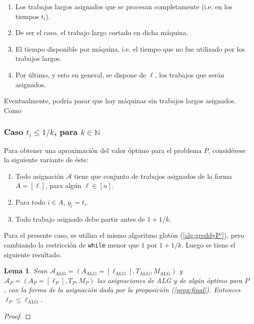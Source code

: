 \documentclass[10pt]{article}
\newcommand{\N}{\mathbb N}
\theoremstyle{plain}
\newtheorem{lem}{Lema}
\theoremstyle{definition}
\begin{document}
\begin{enumerate}
\item Los trabajos largos asignados que se procesan completamente (i.e. en los tiempos $t_i$).
\item De ser el caso, el trabajo largo cortado en dicha máquina.
\item El tiempo disponible por máquina, i.e. el tiempo que no fue utilizado por los trabajos largos.
\item Por último, y esto en general, se dispone de $\ell$, los trabajos que serán asignados. 
\end{enumerate} 

Eventualmente, podría pasar que hay máquinas sin trabajos largos asignados. Como  
\newpage
\subsubsection*{Caso $t_i \leq 1/k$, para $k \in \N$}

Para obtener una aproximación del valor óptimo para el problema $P$, considérese la siguiente variante de éste: 
\begin{enumerate}
\item Todo asignación $\mathcal{A}$ tiene que conjunto de trabajos asignados de la forma $A=[\ell]$, para algún $\ell \in [n]$. 
\item Para todo $i \in A$, $y_i = t_i$.
\item Todo trabajo asignado debe partir antes de $1+1/k$. 
\end{enumerate}

Para el presente caso, se utiliza el mismo algoritmo glotón (\ref{alg:greddyP'}), pero cambiando la restricción de \texttt{while} menor que $1$ por $1+1/k$. Luego se tiene el siguiente resultado.

\begin{lem}
\label{lem:eles}
Sean $\mathcal{A}_{\text{ALG}} = (A_{\text{ALG}} = [\ell_{\text{ALG}}], T_{\text{ALG}}, M_{\text{ALG}})$ y $\mathcal{A}_{P} = (A_P = [\ell_P], T_P, M_P)$ las asignaciones de ALG y de algún óptimo para $P$, con la forma de la asignación dada por la proposición (\ref{prop:final}). Entonces $\ell_P \leq \ell_{\text{ALG}}$.
\end{lem}

\begin{proof}

\end{proof}
\end{document}
